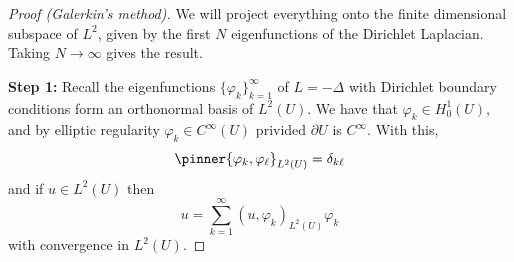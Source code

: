 \documentclass{article}
\begin{document}
\begin{proof}
    [Proof (Galerkin's method)] We will project everything onto the finite dimensional subspace of \(L^2\), given by the first \(N\) eigenfunctions of the Dirichlet Laplacian. Taking \(N \to \infty\) gives the result.

    \textbf{Step 1:} Recall the eigenfunctions \(\{\varphi_k\}_{k=1}^\infty\) of \(L = -\Delta\)  with Dirichlet boundary conditions form an orthonormal basis of \(L^2(U)\). We have that \(\varphi_k \in H^1_0(U)\), and by elliptic regularity \(\varphi_k \in C^\infty(U)\) privided \(\partial U\) is \(C^\infty\). With this,
    \[\pinner{\varphi_k, \varphi_\ell}_{L^2(U)} = \delta_{k\ell}\]
    and if \(u \in L^2(U)\) then
    \[u = \sum_{k=1}^\infty(u, \varphi_k)_{L^2(U)}\varphi_k\]
    with convergence in \(L^2(U)\).


\end{proof}
\end{document}
